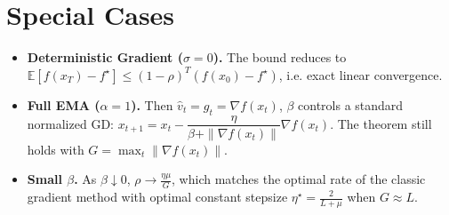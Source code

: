\documentclass{article}
\begin{document}
\section*{Special Cases}
\begin{itemize}
    \item \textbf{Deterministic Gradient ($\sigma=0$).}  
          The bound reduces to
          $\mathbb{E}[f(x_T)-f^\star]\le(1-\rho)^{T}(f(x_0)-f^\star)$,
          i.e. exact linear convergence.
    \item \textbf{Full EMA ($\alpha=1$).}  
          Then $\hat v_t=g_t=\nabla f(x_t)$, $\beta$ controls a standard
          normalized GD: $x_{t+1}=x_t-\dfrac{\eta}{\beta+\|\nabla f(x_t)\|}\nabla f(x_t)$.
          The theorem still holds with $G=\max_t\|\nabla f(x_t)\|$.
    \item \textbf{Small $\beta$.}  
          As $\beta\downarrow0$, $\rho\to\frac{\eta\mu}{G}$, which matches the
          optimal rate of the classic gradient method with optimal constant stepsize
          $\eta^\star = \frac{2}{L+ \mu}$ when $G\approx L$.
\end{itemize}
\end{document}
